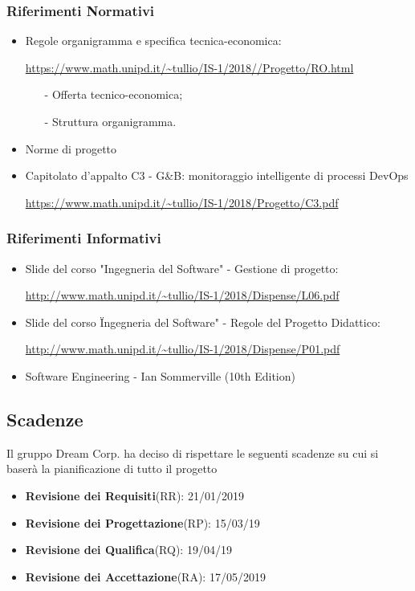 			\subsubsection{Riferimenti Normativi}
				\begin{itemize}
					\item Regole organigramma e specifica tecnica-economica:

					\url{https://www.math.unipd.it/~tullio/IS-1/2018//Progetto/RO.html}
						\begin{itemize}
							\item[-] Offerta tecnico-economica;
							\item[-]Struttura organigramma.
						\end{itemize}
					\item Norme di progetto
					\item Capitolato d'appalto C3 - G\&B: monitoraggio intelligente di processi DevOps
					
					\url{https://www.math.unipd.it/~tullio/IS-1/2018/Progetto/C3.pdf}
				\end{itemize}
				
			\subsubsection{Riferimenti Informativi}
				\begin{itemize}
					\item Slide del corso "Ingegneria del Software" - Gestione di progetto:
					
					\url{http://www.math.unipd.it/~tullio/IS-1/2018/Dispense/L06.pdf}
					\item Slide del corso \"Ingegneria del Software" - Regole del Progetto Didattico:

					\url{http://www.math.unipd.it/~tullio/IS-1/2018/Dispense/P01.pdf}

					\item Software Engineering - Ian Sommerville (10th Edition)
				\end{itemize}

		\subsection{Scadenze}
			Il gruppo Dream Corp. ha deciso di rispettare le seguenti scadenze su cui si baserà la pianificazione di tutto il progetto
			\begin{itemize}
				\item \textbf{Revisione dei Requisiti}(RR): 21/01/2019
				\item \textbf{Revisione dei Progettazione}(RP): 15/03/19
				\item \textbf{Revisione dei Qualifica}(RQ): 19/04/19
				\item \textbf{Revisione dei Accettazione}(RA): 17/05/2019
			\end{itemize}



	\newpage